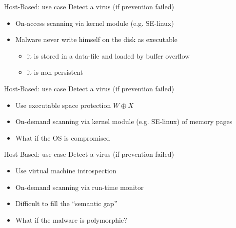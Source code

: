 \documentclass{beamer}
\begin{document}
\begin{frame}[t]{Host-Based: use case}
  Detect a virus (if prevention failed)
  \\[20pt]
  \begin{itemize}
  \item On-access scanning via kernel module (e.g. SE-linux)
  \\[20pt]
  \item<2-> Malware never write himself on the disk as executable
    \begin{itemize}
      \item<3-> it is stored in a data-file and loaded by buffer overflow
      \item<4-> it is non-persistent
    \end{itemize}
  \end{itemize}
\end{frame}

\begin{frame}[t]{Host-Based: use case}
  Detect a virus (if prevention failed)
  \\[20pt]
  \begin{itemize}
  \item Use executable space protection $W \oplus X$
  \item On-demand scanning via kernel module (e.g. SE-linux) of memory pages
  \\[20pt]
  \item<2-> What if the OS is compromised
  \end{itemize}
\end{frame}

\begin{frame}[t]{Host-Based: use case}
  Detect a virus (if prevention failed)
  \\[20pt]
  \begin{itemize}
  \item Use virtual machine introspection
  \item On-demand scanning via run-time monitor
  \\[20pt]
  \item<2-> Difficult to fill the ``semantic gap''
  \item<3-> What if the malware is polymorphic?
  \end{itemize}
\end{frame}
\end{document}
